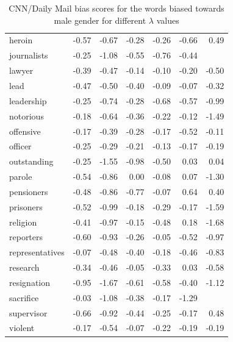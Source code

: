 \documentclass[11pt,a4paper]{article}
\begin{document}
\begin{table}[t]
\begin{tabular}{|l|r|r|r|r|r|r|}
heroin          & -0.57 & -0.67 & -0.28 & -0.26 & -0.66 & 0.49  \\
journalists     & -0.25 & -1.08 & -0.55 & -0.76 & -0.44 &       \\
lawyer          & -0.39 & -0.47 & -0.14 & -0.10 & -0.20 & -0.50 \\
lead            & -0.47 & -0.50 & -0.40 & -0.09 & -0.07 & -0.32 \\
leadership      & -0.25 & -0.74 & -0.28 & -0.68 & -0.57 & -0.99 \\
notorious       & -0.18 & -0.64 & -0.36 & -0.22 & -0.12 & -1.49 \\
offensive       & -0.17 & -0.39 & -0.28 & -0.17 & -0.52 & -0.11 \\
officer         & -0.25 & -0.29 & -0.21 & -0.13 & -0.17 & -0.19 \\
outstanding     & -0.25 & -1.55 & -0.98 & -0.50 & 0.03  & 0.04  \\
parole          & -0.54 & -0.86 & 0.00  & -0.08 & 0.07  & -1.30 \\
pensioners      & -0.48 & -0.86 & -0.77 & -0.07 & 0.64  & 0.40  \\
prisoners       & -0.52 & -0.99 & -0.18 & -0.29 & -0.17 & -1.59 \\
religion        & -0.41 & -0.97 & -0.15 & -0.48 & 0.18  & -1.68 \\
reporters       & -0.60 & -0.93 & -0.26 & -0.05 & -0.52 & -0.97 \\
representatives & -0.07 & -0.48 & -0.40 & -0.18 & -0.46 & -0.83 \\
research        & -0.34 & -0.46 & -0.05 & -0.33 & 0.03  & -0.58 \\
resignation     & -0.95 & -1.67 & -0.61 & -0.58 & -0.40 & -1.12 \\
sacrifice       & -0.03 & -1.08 & -0.38 & -0.17 & -1.29 &       \\
supervisor      & -0.66 & -0.92 & -0.44 & -0.25 & -0.17 & 0.48  \\
violent         & -0.17 & -0.54 & -0.07 & -0.22 & -0.19 & -0.19\\
 \bottomrule
    \end{tabular}
    \caption{ CNN/Daily Mail bias scores for the words biased towards male gender for  different  $\lambda$  values}
    \label{tab:dmm}
\end{table}
\end{document}
